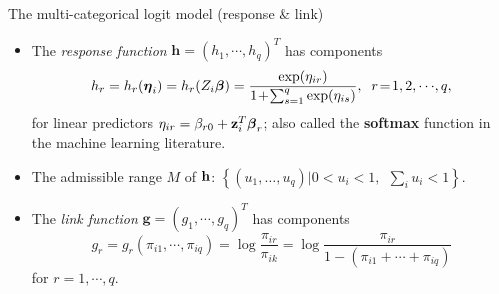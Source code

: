 \documentclass{beamer}
\newenvironment{wideitemize}%
  {\begin{itemize}%
    \setlength{\parskip}{1em}}%
  {\end{itemize}}
\begin{document}
\begin{frame} {The multi-categorical logit model (response \& link)}
\begin{wideitemize}



\item The  \emph{response function} $\textbf{h}=(h_1,\cdots, h_q)^T$ has components
$$h_r=h_r(\mbox{\boldmath $\eta$}_i)=h_r(Z_i\mbox{\boldmath $\beta$})=
\frac{\exp(\eta_{ir})}{1\!+\!\sum_{s=1}^q \exp(\eta_{is})}, \;\;  r\!=\!1,2,\cdots\!, q,$$
for linear predictors $\eta_{ir}=\beta_{r0}+\textbf{z}_i^T\mbox{\boldmath $\beta$}_r$; also called  the {\bf softmax} function in the machine learning literature.



\item The admissible range $M$ of ${\bf h}$:  
$
\left\{   (u_1, \dots, u_q) | 0  < u_i < 1, \ \   \sum_i u_i < 1  \right\}.
$


\item The  \emph{link function} $\textbf{g}=(g_1,\cdots, g_q)^T$ has components
\[
g_r=g_r(\pi_{i1},\cdots,\pi_{iq})=\log\frac{\pi_{ir}}{\pi_{ik}}=\log\frac{\pi_{ir}}{1-
(\pi_{i1}+\cdots+\pi_{iq})}
\]
for $r=1,\cdots, q$.

\end{wideitemize}
\end{frame}







\end{document}
